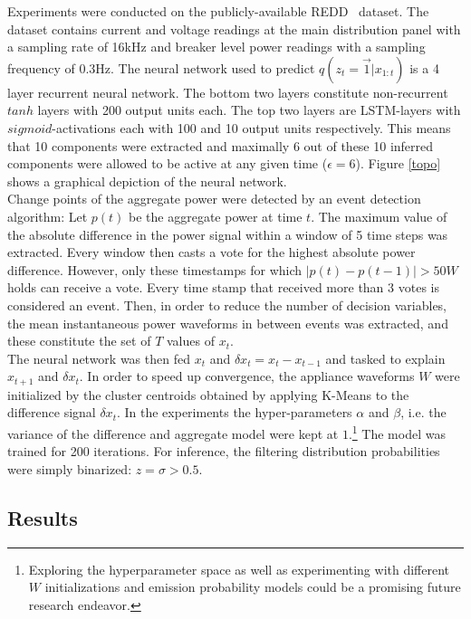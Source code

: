 Experiments were conducted on the publicly-available REDD~\cite{kolter2011redd} dataset. The dataset contains current and voltage readings at the main distribution panel with a sampling rate of 16kHz and breaker level power readings with a sampling frequency of 0.3Hz. The neural network used to predict $q(z_t = \vec{1}|x_{1:t})$ is a 4 layer recurrent neural network. The bottom two layers constitute non-recurrent $tanh$ layers with 200 output units each. The top two layers are LSTM-layers with $sigmoid$-activations each with 100 and 10 output units respectively. This means that 10 components were extracted and maximally 6 out of these 10 inferred components were allowed to be active at any given time ($\epsilon = 6$). Figure \ref{topo} shows a graphical depiction of the neural network.\\
Change points of the aggregate power were detected by an event detection algorithm: Let $p(t)$ be the aggregate power at time $t$. The maximum value of the absolute difference in the power signal within a window of 5 time steps was extracted. Every window then casts a vote for the highest absolute power difference. However, only these timestamps for which $|p(t) - p(t-1)| > 50W$ holds can receive a vote. Every time stamp that received more than 3 votes is considered an event. Then, in order to reduce the number of decision variables, the mean instantaneous power waveforms in between events was extracted, and these constitute the set of $T$ values of $x_t$.\\
The neural network was then fed $x_t$ and $\delta x_t = x_t - x_{t-1}$ and tasked to explain $x_{t+1}$ and $\delta x_t$. In order to speed up convergence, the appliance waveforms $W$ were initialized by the cluster centroids obtained by applying K-Means to the difference signal $\delta x_t$. In the experiments the hyper-parameters $\alpha$ and $\beta$, i.e. the variance of the difference and aggregate model were kept at $1$.\footnote{Exploring the hyperparameter space as well as experimenting with different $W$ initializations and emission probability models could be a promising future research endeavor.} The model was trained for 200 iterations. For inference, the filtering distribution probabilities were simply binarized: $z = \sigma > 0.5$.



\subsection{Results}

